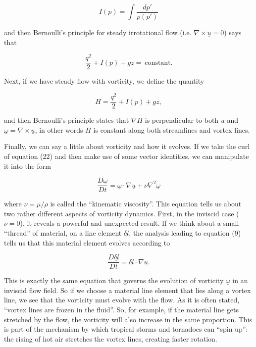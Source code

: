   \begin{equation*}I(p)=\int{\dfrac{dp'}{\rho(p')}} \tag{27}\end{equation*} 

  \noindent{}and then Bernoulli's principle for steady irrotational flow (i.e. 
  $\nabla \times \underline{u}=0$) says that 

  \begin{equation*}\dfrac{q^2}{2}+I(p)+gz = \mathrm{~constant.} 
  \tag{28}\end{equation*} 

  Next, if we have steady flow with vorticity, we define the quantity 

  \begin{equation*}H=\dfrac{q^2}{2}+I(p)+gz , \tag{29}\end{equation*} 

  \noindent{}and then Bernoulli's principle states that $\nabla H$ is 
  perpendicular to both $\underline{u}$ and $\underline{\omega} = \nabla \times 
  \underline{u}$, in other words $H$ is constant along both streamlines and 
  vortex lines. 

  Finally, we can say a little about vorticity and how it evolves. If we take 
  the curl of equation (22) and then make use of some vector identities, we can 
  manipulate it into the form 

  \begin{equation*}\dfrac{D \underline{\omega}}{Dt}=\underline{\omega} \cdot 
  \nabla\underline{u} + \nu \nabla^2 \underline{\omega} \tag{30}\end{equation*} 

  \noindent{}where $\nu=\mu/\rho$ is called the ``kinematic viscosity''. This 
  equation tells us about two rather different aspects of vorticity dynamics. 
  First, in the inviscid case ($\nu=0$), it reveals a powerful and unexpected 
  result. If we think about a small ``thread'' of material, on a line element 
  $\underline{\delta l}$, the analysis leading to equation (9) tells us that 
  this material element evolves according to 

  \begin{equation*}\dfrac{D \underline{\delta l}}{Dt}=\underline{\delta l} 
  \cdot \nabla\underline{u} . \tag{31}\end{equation*} 

  This is exactly the same equation that governs the evolution of vorticity 
  $\underline{\omega}$ in an inviscid flow field. So if we choose a material 
  line element that lies along a vortex line, we see that the vorticity must 
  evolve with the flow. As it is often stated, ``vortex lines are frozen in the 
  fluid''. So, for example, if the material line gets stretched by the flow, 
  the vorticity will also increase in the same proportion. This is part of the 
  mechanism by which tropical storms and tornadoes can ``spin up'': the rising 
  of hot air stretches the vortex lines, creating faster rotation. 

